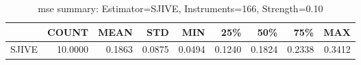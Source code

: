 \begin{table}[ht]
\centering
\caption{mse summary: Estimator=SJIVE, Instruments=166, Strength=0.10}
\begin{tabular}{lrrrrrrrr}
\toprule
 & COUNT & MEAN & STD & MIN & 25\% & 50\% & 75\% & MAX \\
\midrule
SJIVE & 10.0000 & 0.1863 & 0.0875 & 0.0494 & 0.1240 & 0.1824 & 0.2338 & 0.3412 \\
\bottomrule
\end{tabular}
\end{table}
